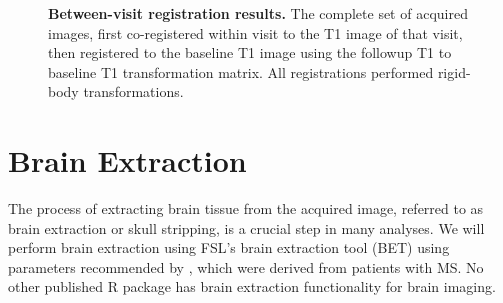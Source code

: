 \documentclass[a4paper]{report}\usepackage[]{graphicx}\usepackage[]{color}
\begin{document}
\begin{article}
\begin{figure}
{} \hspace*{-0.9em}
\hfill
\hfill
\hfill
\caption{{\bf Between-visit registration results.} The complete set of acquired images, first co-registered within visit to the T1 image of that visit, then registered to the baseline T1 image using the followup T1 to baseline T1 transformation matrix.  All registrations performed rigid-body transformations.}
\label{fig:reg_results}
\end{figure}



\section{Brain Extraction}
The process of extracting brain tissue from the acquired image, referred to as brain extraction or skull stripping, is a crucial step in many analyses.  We will perform brain extraction using FSL's brain extraction tool (BET) \citep{smith_fast_2002, jenkinson_bet2:_2005} using parameters recommended by \citet{popescu_optimizing_2012}, which were derived from patients with MS.  No other published R package has brain extraction functionality for brain imaging.  
 



\end{article}
\end{document}
